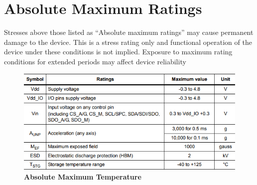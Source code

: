 \section{Absolute Maximum Ratings}
Stresses above those listed as “Absolute maximum ratings” may cause permanent damage 
to the device. This is a stress rating only and functional operation of the device under these 
conditions is not implied. Exposure to maximum rating conditions for extended periods may 
affect device reliability

\begin{figure}[h!]
	\centering	\includegraphics[width=\linewidth]{Images/absolmax}
	\caption{\textbf{Absolute Maximum Temperature }} 
\end{figure}


